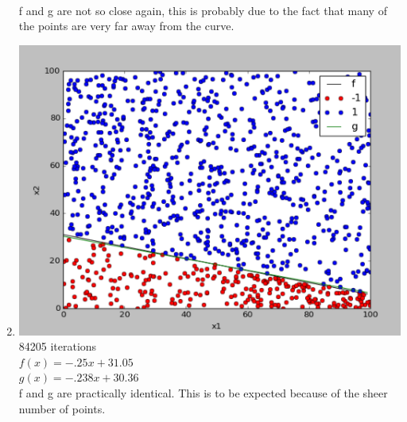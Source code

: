 \documentclass[12pt]{article}
\begin{document}
\begin{enumerate}[label=(\alph*)]
	\\ f and g are not so close again, this is probably due to the fact that many of the points are very far away from the curve.
	\item \includegraphics[scale=.5]{1-4-4.png}
	\\ 84205 iterations
	\\ $f(x) = -.25x + 31.05$
	\\ $g(x) = -.238x + 30.36$
	\\ f and g are practically identical. This is to be expected because of the sheer number of points.
\end{enumerate}
\end{document}
